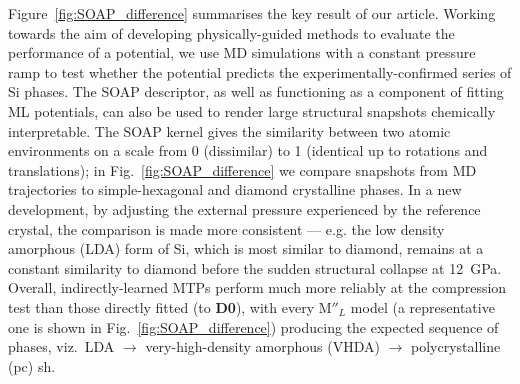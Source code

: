 \documentclass[12pt,a4paper,twoside,nobind]{ociamthesis}
\newcommand{\ind}[1]{\mathrm{#1''\!\!}}
\begin{document}
Figure\ \ref{fig:SOAP_difference} summarises the key result of our article.\autocite{Morrow2022} Working towards the aim of developing physically-guided methods to evaluate the performance of a potential,
we use MD simulations with a constant pressure ramp to test whether the potential predicts the experimentally-confirmed series of Si phases.
The SOAP descriptor, as well as functioning as a component of fitting ML potentials, can also be used to render large structural snapshots chemically interpretable.
The SOAP kernel gives the similarity between two atomic environments on a scale from 0 (dissimilar) to 1 (identical up to rotations and translations); in Fig.\ \ref{fig:SOAP_difference} we compare snapshots
from MD trajectories to simple-hexagonal and diamond crystalline phases. In a new development, by adjusting the external pressure experienced by the reference crystal, the comparison is made more
consistent --- e.g. the low density amorphous (LDA) form of Si, which is most similar to diamond, remains at a constant similarity to diamond before the sudden structural collapse at \SI{12}{GPa}.
Overall, indirectly-learned MTPs perform much more reliably at the compression test than those directly fitted (to \textbf{D0}), 
with every $\ind{M}_{L}$ model (a representative one is shown in Fig.\ \ref{fig:SOAP_difference})
producing the expected sequence of phases, viz.\ LDA $\longrightarrow$ very-high-density amorphous (VHDA) $\longrightarrow$ polycrystalline (pc) sh.\autocite{Deringer2021}
\end{document}
